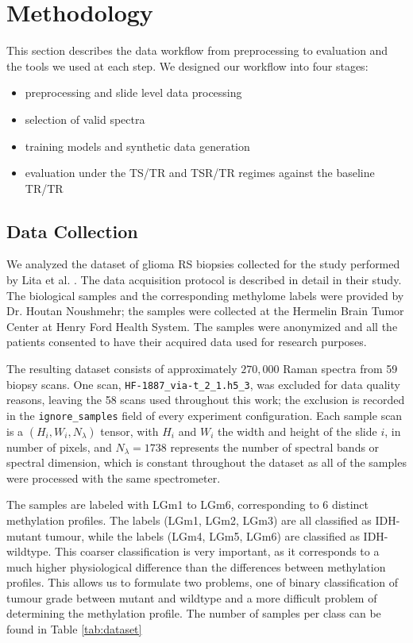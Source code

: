 \chapter{Methodology}
\label{ch:methodology}

This section describes the data workflow from preprocessing to evaluation and the tools we used at each step. We designed our workflow into four stages:
\begin{itemize}
    \item preprocessing and slide level data processing
    \item selection of valid spectra
    \item training models and synthetic data generation
    \item evaluation under the TS/TR and TSR/TR regimes against the baseline TR/TR
\end{itemize}

\section{Data Collection}
\label{sec:data_collection}

We analyzed the dataset of glioma RS biopsies collected for the study performed by Lita et al. \cite{apollonov2024raman}. The data acquisition protocol is described in detail in their study. The biological samples and the corresponding methylome labels were provided by Dr. Houtan Noushmehr; the samples were collected at the Hermelin Brain Tumor Center at Henry Ford Health System. The samples were anonymized and all the patients consented to have their acquired data used for research purposes.

The resulting dataset consists of approximately $270{,}000$ Raman spectra from 59 biopsy scans. One scan, \texttt{HF-1887\_via-t\_2\_1.h5\_3}, was excluded for data quality reasons, leaving the 58 scans used throughout this work; the exclusion is recorded in the \texttt{ignore\_samples} field of every experiment configuration. Each sample scan is a $(H_i,W_i,N_\lambda)$ tensor, with $H_i$ and $W_i$ the width and height of the slide $i$, in number of pixels, and $N_\lambda = 1738$ represents the number of spectral bands or spectral dimension, which is constant throughout the dataset as all of the samples were processed with the same spectrometer.

The samples are labeled with LGm1 to LGm6, corresponding to 6 distinct methylation profiles. The labels (LGm1, LGm2, LGm3) are all classified as IDH-mutant tumour, while the labels (LGm4, LGm5, LGm6) are classified as IDH-wildtype. This coarser classification is very important, as it corresponds to a much higher physiological difference than the differences between methylation profiles. This allows us to formulate two problems, one of binary classification of tumour grade between mutant and wildtype and a more difficult problem of determining the methylation profile. The number of samples per class can be found in Table \ref{tab:dataset}

